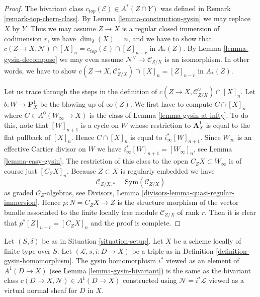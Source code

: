 \begin{proof}
The bivariant class $c_{top}(\mathcal{E}) \in A^*(Z \cap Y)$ was
defined in Remark \ref{remark-top-chern-class}.
By Lemma \ref{lemma-construction-gysin} we may replace $X$ by $Y$.
Thus we may assume $Z \to X$ is a regular closed immersion
of codimension $r$, we have $\dim_\delta(X) = n$, and we have
to show that $c(Z \to X, \mathcal{N}) \cap [X]_n =
c_{top}(\mathcal{E}) \cap [Z]_{n - r}$ in $A_*(Z)$.
By Lemma \ref{lemma-gysin-decompose} we may even assume
$\mathcal{N}^\vee \to \mathcal{C}_{Z/X}$ is an isomorphism.
In other words, we have to show
$c(Z \to X, \mathcal{C}_{Z/X}^\vee) \cap [X]_n = [Z]_{n - r}$ in $A_*(Z)$.

\medskip\noindent
Let us trace through the steps in the definition of
$c(Z \to X, \mathcal{C}_{Z/X}^\vee) \cap [X]_n$. Let
$b : W \to \mathbf{P}^1_X$
be the blowing up of $\infty(Z)$. We first have to compute
$C \cap [X]_n$ where $C \in A^0(W_\infty \to X)$ is
the class of Lemma \ref{lemma-gysin-at-infty}.
To do this, note that $[W]_{n + 1}$
is a cycle on $W$ whose restriction to $\mathbf{A}^1_X$ is
equal to the flat pullback of $[X]_n$. Hence $C \cap [X]_n$
is equal to $i_\infty^*[W]_{n + 1}$. Since $W_\infty$ is an
effective Cartier divisor on $W$ we have
$i_\infty^*[W]_{n + 1} = [W_\infty]_n$, see Lemma \ref{lemma-easy-gysin}.
The restriction of this class to the open $C_ZX \subset W_\infty$
is of course just $[C_ZX]_n$. Because $Z \subset X$ is regularly
embedded we have
$$
\mathcal{C}_{Z/X, *} = \text{Sym}(\mathcal{C}_{Z/X})
$$
as graded $\mathcal{O}_Z$-algebras, see
Divisors, Lemma \ref{divisors-lemma-quasi-regular-immersion}.
Hence $p : N = C_ZX \to Z$ is the structure morphism of the
vector bundle associated to the finite locally free module
$\mathcal{C}_{Z/X}$ of rank $r$. Then it is clear that
$p^*[Z]_{n - r} = [C_ZX]_n$ and the proof is complete.
\end{proof}

\begin{lemma}
\label{lemma-gysin-agrees}
Let $(S, \delta)$ be as in Situation \ref{situation-setup}. Let $X$ be a scheme
locally of finite type over $S$. Let $(\mathcal{L}, s, i : D \to X)$
be a triple as in Definition \ref{definition-gysin-homomorphism}.
The gysin homomorphism $i^*$ viewed as an element of $A^1(D \to X)$
(see Lemma \ref{lemma-gysin-bivariant}) is the same as the bivariant class
$c(D \to X, \mathcal{N}) \in A^1(D \to X)$
constructed using $\mathcal{N} = i^*\mathcal{L}$
viewed as a virtual normal sheaf for $D$ in $X$.
\end{lemma}

